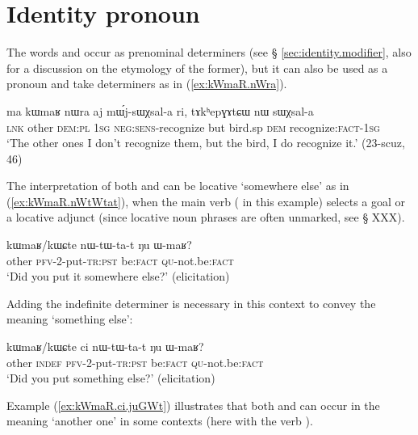 \section{Identity pronoun} \label{sec:other.pro}
The words  and  occur as prenominal determiners (see § \ref{sec:identity.modifier}, also for a discussion on the etymology of the former), but it can also be used as a pronoun and take determiners as in (\ref{ex:kWmaR.nWra}).

\begin{exe}
\ex \label{ex:kWmaR.nWra}
\gll ma kɯmaʁ nɯra aj mɯ́j-sɯχsal-a ri, tɤkʰepɣɤtɕɯ nɯ sɯχsal-a  \\
\textsc{lnk} other \textsc{dem:pl} \textsc{1sg} \textsc{neg}:\textsc{sens}-recognize but bird.sp \textsc{dem} recognize:\textsc{fact}-\textsc{1sg} \\
\glt `The other ones I don't recognize them, but the  bird, I do recognize it.' (23-scuz, 46)
\end{exe}

The interpretation of both  and  can be locative  `somewhere else' as in (\ref{ex:kWmaR.nWtWtat}), when the main verb ( in this example) selects a goal or a locative adjunct (since locative noun phrases are often unmarked, see § XXX).

\begin{exe}
\ex \label{ex:kWmaR.nWtWtat}
\gll kɯmaʁ/kɯɕte   nɯ-tɯ-ta-t ŋu ɯ-maʁ? \\
other  \textsc{pfv}-2-put-\textsc{tr}:\textsc{pst} be:\textsc{fact} \textsc{qu}-not.be:\textsc{fact} \\
\glt `Did you put it somewhere else?' (elicitation)
\end{exe}

Adding the indefinite determiner  is necessary in this context to convey the meaning `something else':

\begin{exe}
\ex \label{ex:kWmaR.ci.nWtWtat}
\gll kɯmaʁ/kɯɕte ci nɯ-tɯ-ta-t ŋu ɯ-maʁ? \\
other \textsc{indef} \textsc{pfv}-2-put-\textsc{tr}:\textsc{pst} be:\textsc{fact} \textsc{qu}-not.be:\textsc{fact} \\
\glt `Did you put something else?' (elicitation)
\end{exe}

Example (\ref{ex:kWmaR.ci.juGWt}) illustrates that both  and  can occur in the meaning `another one' in some contexts (here with the verb ).

